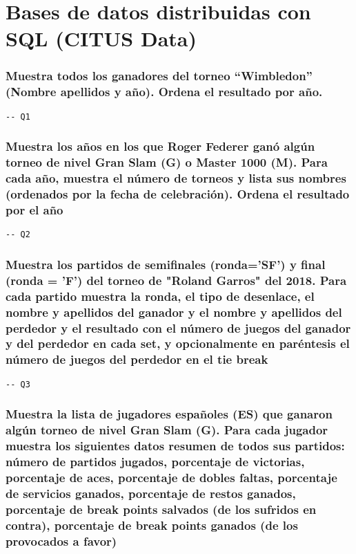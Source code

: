 \section{Bases de datos distribuidas con SQL (CITUS Data)}

\subsubsection{Muestra todos los ganadores del torneo ``Wimbledon'' (Nombre apellidos y año). Ordena el resultado por año.}

\begin{verbatim}
-- Q1
\end{verbatim}





\subsubsection{Muestra los años en los que Roger Federer ganó algún torneo de nivel Gran Slam (G) o Master 1000 (M). Para cada año, muestra el número de torneos y lista sus nombres (ordenados por la fecha de celebración). Ordena el resultado por el año}

\begin{verbatim}
-- Q2
\end{verbatim}





\subsubsection{Muestra los partidos de semiﬁnales (ronda='SF') y ﬁnal (ronda = 'F') del torneo de "Roland Garros" del 2018. Para cada partido muestra la ronda, el tipo de desenlace, el nombre y apellidos del ganador y el nombre y apellidos del perdedor y el resultado con el número de juegos del ganador y del perdedor en cada set, y opcionalmente en paréntesis el número de juegos del perdedor en el tie break}

\begin{verbatim}
-- Q3
\end{verbatim}





\subsubsection{Muestra la lista de jugadores españoles (ES) que ganaron algún torneo de nivel Gran Slam (G). Para cada jugador muestra los siguientes datos resumen de todos sus partidos: número de partidos jugados, porcentaje de victorias, porcentaje de aces, porcentaje de dobles faltas, porcentaje de servicios ganados, porcentaje de restos ganados, porcentaje de break points salvados (de los sufridos en contra), porcentaje de break points ganados (de los provocados a favor)}

